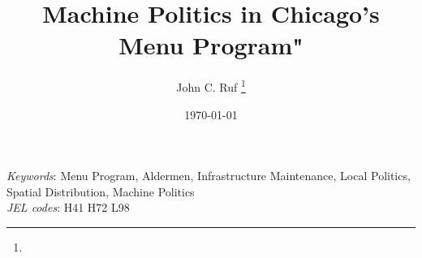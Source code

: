 \documentclass[11pt]{article}
\title{Machine Politics in Chicago's Menu Program"}
\author{John C. Ruf \thanks{\rufemail}}
\date{\today}
\renewcommand{\=}[1]{\stackrel{#1}{=}} %
\theoremstyle{definition}
\begin{document}

\maketitle

\begin{abstract}

\end{abstract}
\vspace{1cm}
{\small
\noindent \textit{Keywords}: Menu Program, Aldermen, Infrastructure Maintenance, Local Politics, Spatial Distribution, Machine Politics  \\
\textit{JEL codes}: H41 H72 L98 
}
\thispagestyle{empty}
\newpage
\setcounter{page}{1}


%
%
%
%










{}

\newpage
\clearpage


% 
%
%
\end{document}
